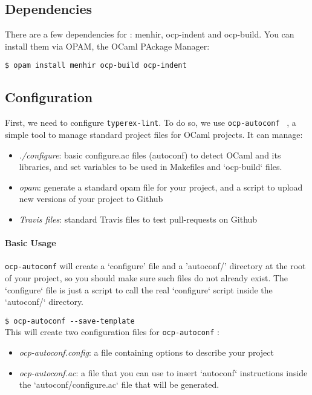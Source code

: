 
\def\ocpautoconf{{\tt ocp-autoconf} }
\def\ocpbuild{{\tt ocp-build} }

\subsection{Dependencies}
There are a few dependencies for \ocplint: menhir, ocp-indent and ocp-build. You
can install them via OPAM, the OCaml PAckage Manager:

{\tt \$ opam install menhir ocp-build ocp-indent}

\subsection{Configuration}
First, we need to configure {\tt typerex-lint}. To do so, we use
\ocpautoconf~\cite{ocp-autoconf}, a simple tool to manage standard project
files for OCaml projects. It can manage:
\begin{itemize}
\item {\em ./configure}: basic configure.ac files (autoconf) to detect OCaml and
  its libraries, and set variables to be used in Makefiles and `ocp-build`
  files.
\item {\em opam}: generate a standard opam file for your project, and a script to
  upload new versions of your project to Github
\item {\em Travis files}: standard Travis files to test pull-requests on Github
\end{itemize}

\paragraph{Basic Usage} \ocpautoconf will create a `configure' file and a
'autoconf/' directory at the root of your project, so you should make sure such
files do not already exist. The `configure` file is just a script to call the
real `configure` script inside the `autoconf/` directory. 

{\tt \$ ocp-autoconf \--\--save-template}\\

This will create two configuration files for \ocpautoconf: 
\begin{itemize}
\item {\em ocp-autoconf.config}: a file containing options to describe your
  project 
\item {\em ocp-autoconf.ac}: a file that you can use to insert `autoconf`
  instructions inside the `autoconf/configure.ac` file that will be generated.
\end{itemize}

